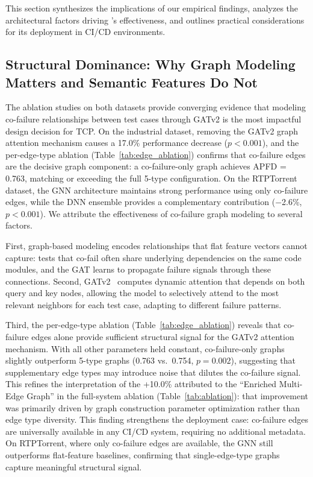 
This section synthesizes the implications of our empirical findings, analyzes the
architectural factors driving \filopriori{}'s effectiveness, and outlines practical
considerations for its deployment in CI/CD environments.

\subsection{Structural Dominance: Why Graph Modeling Matters and Semantic Features Do Not}

The ablation studies on both datasets provide converging evidence that
modeling co-failure relationships between test cases through GATv2 is the
most impactful design decision for TCP. On the industrial dataset, removing
the GATv2 graph attention mechanism causes a 17.0\% performance decrease
($p < 0.001$), and the per-edge-type ablation
(Table~\ref{tab:edge_ablation}) confirms that co-failure edges are the
decisive graph component: a co-failure-only graph achieves APFD = 0.763,
matching or exceeding the full 5-type configuration. On the RTPTorrent
dataset, the GNN architecture maintains strong performance using only
co-failure edges, while the DNN ensemble provides a complementary
contribution ($-$2.6\%, $p < 0.001$). We attribute the effectiveness of
co-failure graph modeling to several factors.

First, graph-based modeling encodes relationships that flat feature vectors
cannot capture: tests that co-fail often share underlying dependencies on the
same code modules, and the GAT learns to propagate failure signals through
these connections. Second, GATv2~\cite{brody2022attentive} computes dynamic
attention that depends on both query and key nodes, allowing the model to
selectively attend to the most relevant neighbors for each test case, adapting
to different failure patterns.

Third, the per-edge-type ablation (Table~\ref{tab:edge_ablation}) reveals
that co-failure edges alone provide sufficient structural signal for the
GATv2 attention mechanism. With all other parameters held constant,
co-failure-only graphs slightly outperform 5-type graphs (0.763 vs.\ 0.754,
$p = 0.002$), suggesting that supplementary edge types may introduce noise
that dilutes the co-failure signal. This refines the interpretation of the
+10.0\% attributed to the ``Enriched Multi-Edge Graph'' in the full-system
ablation (Table~\ref{tab:ablation}): that improvement was primarily driven
by graph construction parameter optimization rather than edge type diversity. This finding strengthens the
deployment case: co-failure edges are universally available in any CI/CD
system, requiring no additional metadata. On RTPTorrent, where only
co-failure edges are available, the GNN still outperforms flat-feature
baselines, confirming that single-edge-type graphs capture meaningful
structural signal.

